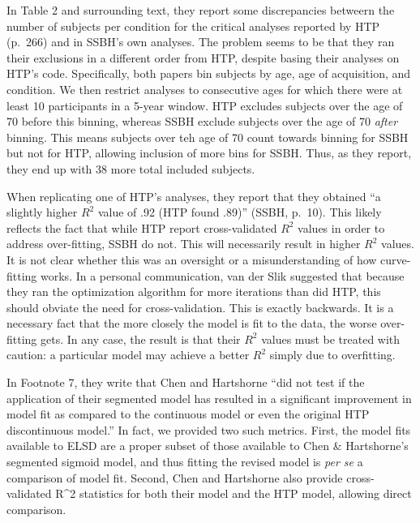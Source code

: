 \begin{appendix}
In Table 2 and surrounding text, they report some discrepancies betweern
the number of subjects per condition for the critical analyses reported
by HTP (p.~266) and in SSBH's own analyses. The problem seems to be that
they ran their exclusions in a different order from HTP, despite basing
their analyses on HTP's code. Specifically, both papers bin subjects by
age, age of acquisition, and condition. We then restrict analyses to
consecutive ages for which there were at least 10 participants in a
5-year window. HTP excludes subjects over the age of 70 before this
binning, whereas SSBH exclude subjects over the age of 70 \emph{after}
binning. This means subjects over teh age of 70 count towards binning
for SSBH but not for HTP, allowing inclusion of more bins for SSBH.
Thus, as they report, they end up with 38 more total included subjects.

When replicating one of HTP's analyses, they report that they obtained
``a slightly higher \(R^2\) value of .92 (HTP found .89)'' (SSBH,
p.~10). This likely reflects the fact that while HTP report
cross-validated \(R^2\) values in order to address over-fitting, SSBH do
not. This will necessarily result in higher \(R^2\) values. It is not
clear whether this was an oversight or a misunderstanding of how
curve-fitting works. In a personal communication, van der Slik suggested
that because they ran the optimization algorithm for more iterations
than did HTP, this should obviate the need for cross-validation. This is
exactly backwards. It is a necessary fact that the more closely the
model is fit to the data, the worse over-fitting gets. In any case, the
result is that their \(R^2\) values must be treated with caution: a
particular model may achieve a better \(R^2\) simply due to overfitting.

In Footnote 7, they write that Chen and Hartshorne ``did not test if the
application of their segmented model has resulted in a significant
improvement in model fit as compared to the continuous model or even the
original HTP discontinuous model.'' In fact, we provided two such
metrics. First, the model fits available to ELSD are a proper subset of
those available to Chen \& Hartshorne's segmented sigmoid model, and
thus fitting the revised model is \emph{per se} a comparison of model
fit. Second, Chen and Hartshorne also provide cross-validated R\^{}2
statistics for both their model and the HTP model, allowing direct
comparison.
\end{appendix}
